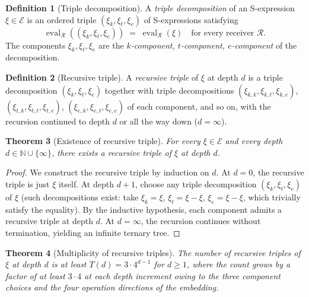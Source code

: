 \documentclass[twocolumn,11pt,a4paper]{article}
\theoremstyle{thmstyle}
\newtheorem{theorem}{Theorem}[section]
\theoremstyle{thmstyle}
\theoremstyle{definition}
\newtheorem{definition}[theorem]{Definition}
\theoremstyle{remark}
\DeclareMathOperator{\eval}{eval}
\newcommand{\Natural}{\mathbb{N}}
\newcommand{\Expr}{\mathcal{E}}
\newcommand{\receiver}{\mathcal{R}}
\begin{document}
\begin{definition}[Triple decomposition]\label{def:triple-decomp}
A \emph{triple decomposition} of an S-expression
$\xi \in \Expr$ is an ordered triple
$(\xi_{k}, \xi_{t}, \xi_{e})$ of S-expressions
satisfying
\[
\eval_{\receiver}((\xi_{k}, \xi_{t}, \xi_{e}))
\;=\; \eval_{\receiver}(\xi)
\quad \text{for every receiver } \receiver.
\]
The components $\xi_{k}, \xi_{t}, \xi_{e}$ are the
\emph{$k$-component, $t$-component, $e$-component} of
the decomposition.
\end{definition}

\begin{definition}[Recursive triple]\label{def:rec-triple}
A \emph{recursive triple} of $\xi$ at depth $d$ is a
triple decomposition $(\xi_{k}, \xi_{t}, \xi_{e})$
together with triple decompositions
$(\xi_{k,k}, \xi_{k,t}, \xi_{k,e})$,
$(\xi_{t,k}, \xi_{t,t}, \xi_{t,e})$,
$(\xi_{e,k}, \xi_{e,t}, \xi_{e,e})$ of each component,
and so on, with the recursion continued to depth $d$
or all the way down ($d = \infty$).
\end{definition}

\begin{theorem}[Existence of recursive triple]
\label{thm:exist-rec-triple}
For every $\xi \in \Expr$ and every depth $d \in
\Natural \cup \{\infty\}$, there exists a recursive
triple of $\xi$ at depth $d$.
\end{theorem}

\begin{proof}
We construct the recursive triple by induction on
$d$.  At $d = 0$, the recursive triple is just
$\xi$ itself.  At depth $d+1$, choose any triple
decomposition $(\xi_{k}, \xi_{t}, \xi_{e})$ of $\xi$
(such decompositions exist: take $\xi_{k} = \xi$,
$\xi_{t} = \xi - \xi$, $\xi_{e} = \xi - \xi$, which
trivially satisfy the equality).  By the inductive
hypothesis, each component admits a recursive
triple at depth $d$.  At $d = \infty$, the recursion
continues without termination, yielding an
infinite ternary tree.
\end{proof}

\begin{theorem}[Multiplicity of recursive triples]
\label{thm:mult-rec-triple}
The number of recursive triples of $\xi$ at depth $d$
is at least $T(d) = 3 \cdot 4^{d-1}$ for $d \geq 1$,
where the count grows by a factor of at least
$3 \cdot 4$ at each depth increment owing to the three
component choices and the four operation directions
of the embedding.
\end{theorem}
\end{document}
